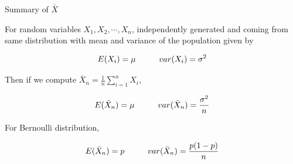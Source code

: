 \documentclass{beamer}\usepackage[]{graphicx}\usepackage[]{color}
\begin{document}
\begin{frame}{Summary of  $\bar{X}$ }

For random variables $X_1, X_2, \cdots, X_n$, independently generated and coming from same distribution with mean and variance of the population given by 

$$ E(X_i) = \mu \hspace{1 cm} var(X_i) = \sigma^2  $$

Then if we compute $ \bar{X}_{n} = \frac{1}{n} \sum_{i=1}^{n} X_i$,

$$ E(\bar{X}_{n}) = \mu  \hspace{1 cm} var(\bar{X}_{n}) = \frac{\sigma^2}{n}  $$

For Bernoulli distribution,

$$ E(\bar{X}_{n}) = p  \hspace{1 cm} var(\bar{X}_{n}) = \frac{p(1-p)}{n}  $$

\end{frame}
\end{document}
